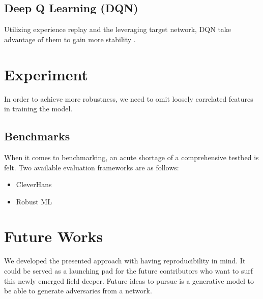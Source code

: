 \documentclass[letterpaper,12pt]{article}
\begin{document}
\subsection{Deep Q Learning (DQN)}
Utilizing experience replay and the leveraging target network, DQN take advantage of them to gain more stability \cite{Pattanaik2018}.

\section{Experiment}
In order to achieve more robustness, we need to omit loosely correlated features in training the model.

\subsection{Benchmarks}
When it comes to benchmarking, an acute shortage of a comprehensive testbed is felt. Two available evaluation frameworks are as follows:
\begin{itemize}
    \item CleverHans \cite{Papernot2016}
    \item Robust ML 
\end{itemize}
 

\section{Future Works}
We developed the presented approach with having reproducibility in mind. It could be served as a launching pad for the future contributors who want to surf this newly emerged field deeper. Future ideas to pursue is a generative model to be able to generate adversaries from a network.





\end{document}

